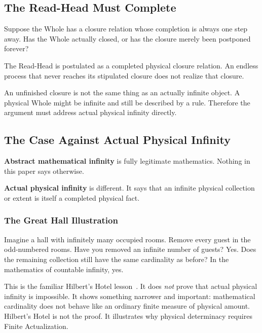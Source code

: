 \documentclass[11pt]{article}
\theoremstyle{canonstyle}
\begin{document}
\subsection{The Read-Head Must Complete}

\begin{reflect}
Suppose the Whole has a closure relation whose completion is always one step away. Has the Whole actually closed, or has the closure merely been postponed forever?
\end{reflect}

The Read-Head is postulated as a completed physical closure relation. An endless process that never reaches its stipulated closure does not realize that closure. 

An unfinished closure is not the same thing as an actually infinite object. A physical Whole might be infinite and still be described by a rule. Therefore the argument must address actual physical infinity directly.

\subsection{The Case Against Actual Physical Infinity}

\textbf{Abstract mathematical infinity} is fully legitimate mathematics. Nothing in this paper says otherwise.

\textbf{Actual physical infinity} is different. It says that an infinite physical collection or extent is itself a completed physical fact.

\subsubsection*{The Great Hall Illustration}

\begin{reflect}
Imagine a hall with infinitely many occupied rooms. Remove every guest in the odd-numbered rooms. Have you removed an infinite number of guests? Yes. Does the remaining collection still have the same cardinality as before? In the mathematics of countable infinity, yes.
\end{reflect}

This is the familiar Hilbert's Hotel lesson~\cite{SEPInfinity}. It does \emph{not} prove that actual physical infinity is impossible. It shows something narrower and important: mathematical cardinality does not behave like an ordinary finite measure of physical amount. Hilbert's Hotel is not the proof. It illustrates why physical determinacy requires Finite Actualization.
\end{document}
